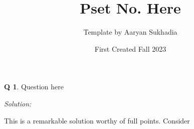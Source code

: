 \documentclass[10pt]{article}
\title{Pset No. Here}
\author{Template by Aaryan Sukhadia}
\date{First Created Fall 2023}
\theoremstyle{definition}
\newtheorem{question}{Q}
\newenvironment{solution}{
    \begin{shaded}
        \textit{Solution:}
        }
    {\end{shaded}
}
\begin{document}
\maketitle

\begin{question}
Question here
\end{question}
\begin{solution}
    This is a remarkable solution worthy of full points. Consider
\end{solution}
\end{document}
